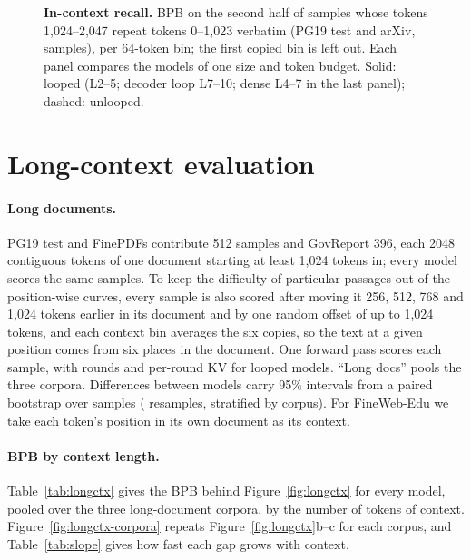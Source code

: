 \begin{figure}[t]
\centering
{}
\caption{\textbf{In-context recall.} BPB on the second half of samples whose tokens 1,024--2,047 repeat tokens
0--1,023 verbatim (PG19 test and arXiv,  samples), per 64-token bin; the first copied bin is
left out. Each panel compares the models of one size and token budget. Solid: looped (L2--5; decoder loop L7--10;
dense L4--7 in the last panel); dashed: unlooped.}
\label{fig:recall}
\end{figure}

\section{Long-context evaluation}
\label{app:longctx}

\paragraph{Long documents.} PG19 test and FinePDFs contribute 512 samples and GovReport 396, each 2048 contiguous
tokens of one document starting at least 1,024 tokens in; every model scores the same samples. To keep the
difficulty of particular passages out of the position-wise curves, every sample is also scored after moving it
256, 512, 768 and 1,024 tokens earlier in its document and by one random offset of up to 1,024 tokens, and each
context bin averages the six copies, so the text at a given position comes from six places in the document. One forward pass scores each sample,
with  rounds and per-round KV for looped models. ``Long docs'' pools the three corpora.
Differences between models carry 95\% intervals from a paired bootstrap over samples (
resamples, stratified by corpus). For FineWeb-Edu we take each token's position in its own document as its
context.

\paragraph{BPB by context length.} Table~\ref{tab:longctx} gives the BPB behind Figure~\ref{fig:longctx} for every model, pooled over the three
long-document corpora, by the number of tokens of context. Figure~\ref{fig:longctx-corpora} repeats
Figure~\ref{fig:longctx}b--c for each corpus, and Table~\ref{tab:slope} gives how fast each gap grows with context.

